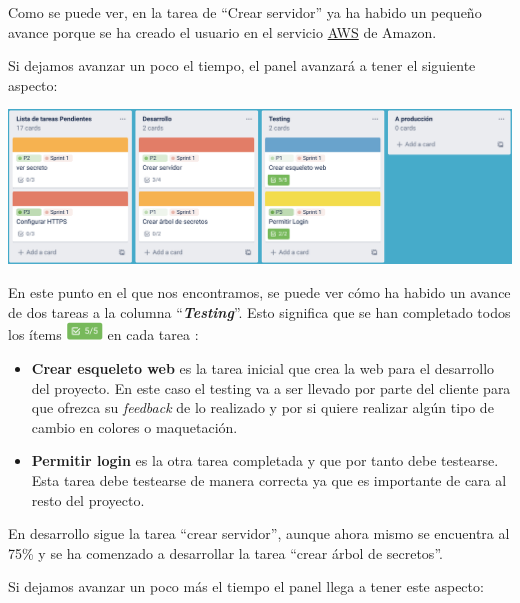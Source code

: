 \documentclass{\ClassPath/viu-tfm-template}
\begin{document}
Como se puede ver, en la tarea de “Crear servidor” ya ha habido un pequeño avance porque se ha creado el usuario en el servicio \href{https://aws.amazon.com/es/}{AWS} de Amazon.

Si dejamos avanzar un poco el tiempo, el panel avanzará a tener el siguiente aspecto:

\begin{center}
    \includegraphics[width=\linewidth]{img/board3.png}
\end{center}

En este punto en el que nos encontramos, se puede ver cómo ha habido un avance de dos tareas a la columna “\textit{\textbf{Testing}}”. Esto significa que se han completado todos los ítems \includegraphics[height=1.3em]{img/items.png} en cada tarea :
\begin{itemize}
    \item \textbf{Crear esqueleto web} es la tarea inicial que crea la web para el desarrollo del proyecto. En este caso el testing va a ser llevado por parte del cliente para que ofrezca su \textit{feedback} de lo realizado y por si quiere realizar algún tipo de cambio en colores o maquetación.

    \item \textbf{Permitir login} es la otra tarea completada y que por tanto debe testearse. Esta tarea debe testearse de manera correcta ya que es importante de cara al resto del proyecto.
\end{itemize}

En desarrollo sigue la tarea “crear servidor”, aunque ahora mismo se encuentra al 75\% y se ha comenzado a desarrollar la tarea “crear árbol de secretos”.

Si dejamos avanzar un poco más el tiempo el panel llega a tener este aspecto:
\end{document}
